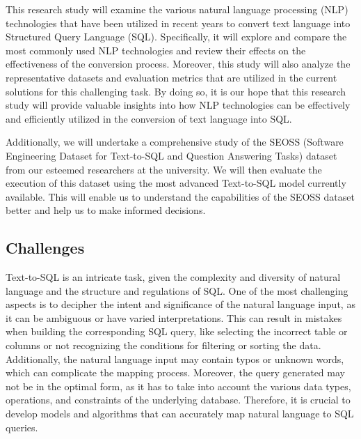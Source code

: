 This research study will examine the various natural language processing (NLP) technologies that have been utilized in recent years to convert text language into Structured Query Language (SQL). Specifically, it will explore and compare the most commonly used NLP technologies and review their effects on the effectiveness of the conversion process. Moreover, this study will also analyze the representative datasets and evaluation metrics that are utilized in the current solutions for this challenging task. By doing so, it is our hope that this research study will provide valuable insights into how NLP technologies can be effectively and efficiently utilized in the conversion of text language into SQL.

Additionally, we will undertake a comprehensive study of the SEOSS (Software Engineering Dataset for Text-to-SQL and Question Answering Tasks) dataset from our esteemed researchers at the university. We will then evaluate the execution of this dataset using the most advanced Text-to-SQL model currently available. This will enable us to understand the capabilities of the SEOSS dataset better and help us to make informed decisions.

\subsection{Challenges}

Text-to-SQL is an intricate task, given the complexity and diversity of natural language and the structure and regulations of SQL. One of the most challenging aspects is to decipher the intent and significance of the natural language input, as it can be ambiguous or have varied interpretations. This can result in mistakes when building the corresponding SQL query, like selecting the incorrect table or columns or not recognizing the conditions for filtering or sorting the data. Additionally, the natural language input may contain typos or unknown words, which can complicate the mapping process. Moreover, the query generated may not be in the optimal form, as it has to take into account the various data types, operations, and constraints of the underlying database. Therefore, it is crucial to develop models and algorithms that can accurately map natural language to SQL queries.

